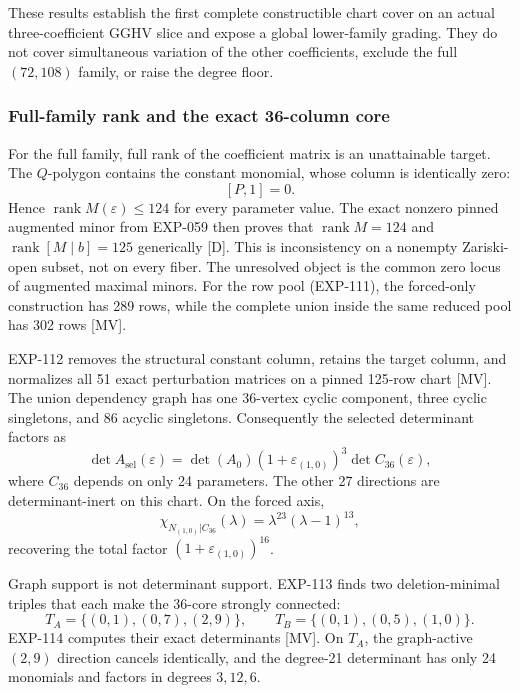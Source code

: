 \documentclass[11pt]{article}
\theoremstyle{remark}
\begin{document}
These results establish the first complete constructible chart cover on an
actual three-coefficient GGHV slice and expose a global lower-family grading.
They do not cover simultaneous variation of the other coefficients, exclude
the full \((72,108)\) family, or raise the degree floor.

\subsubsection{Full-family rank and the exact 36-column core}

For the full family, full rank of the coefficient matrix is an unattainable target.
The \(Q\)-polygon contains the constant monomial, whose column is identically zero:
\[
[P,1]=0.
\]
Hence \(\operatorname{rank}M(\varepsilon)\le124\) for every parameter value.
The exact nonzero pinned augmented minor from EXP-059 then proves that
\(\operatorname{rank}M=124\) and
\(\operatorname{rank}[M\mid b]=125\) generically [D]. This is inconsistency on
a nonempty Zariski-open subset, not on every fiber. The unresolved object is the
common zero locus of augmented maximal minors. For the row pool (EXP-111), the
forced-only construction has 289 rows, while the complete union inside the same
reduced pool has 302 rows [MV].

EXP-112 removes the structural constant column, retains the target column, and
normalizes all 51 exact perturbation matrices on a pinned 125-row chart [MV].
The union dependency graph has one 36-vertex cyclic component, three cyclic
singletons, and 86 acyclic singletons. Consequently the selected determinant
factors as
\[
\det A_{\mathrm{sel}}(\varepsilon)
=\det(A_0)(1+\varepsilon_{(1,0)})^3
\det C_{36}(\varepsilon),
\]
where \(C_{36}\) depends on only 24 parameters. The other 27 directions are
determinant-inert on this chart. On the forced axis,
\[
\chi_{N_{(1,0)}|C_{36}}(\lambda)
=\lambda^{23}(\lambda-1)^{13},
\]
recovering the total factor
\((1+\varepsilon_{(1,0)})^{16}\).

Graph support is not determinant support. EXP-113 finds two
deletion-minimal triples that each make the 36-core strongly connected:
\[
T_A=\{(0,1),(0,7),(2,9)\},\qquad
T_B=\{(0,1),(0,5),(1,0)\}.
\]
EXP-114 computes their exact determinants [MV]. On \(T_A\), the graph-active
\((2,9)\) direction cancels identically, and the degree-21 determinant has only
24 monomials and factors in degrees \(3,12,6\).
\end{document}
